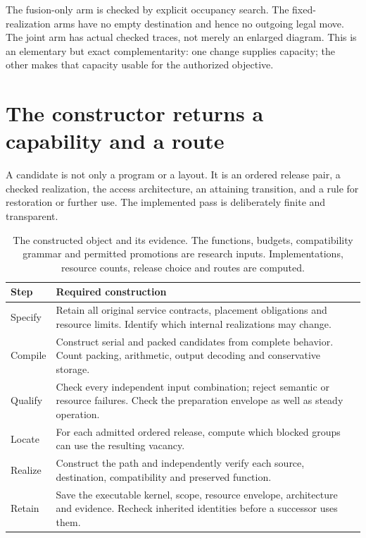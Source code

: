 \documentclass[11pt,letterpaper]{article}
\theoremstyle{definition}\newtheorem{definition}[theorem]{Definition}
\theoremstyle{remark}\newtheorem{remark}[theorem]{Remark}
\begin{document}
The fusion-only arm is checked by explicit occupancy search. The fixed-realization arms have no empty destination and hence no outgoing legal move. The joint arm has actual checked traces, not merely an enlarged diagram. This is an elementary but exact complementarity: one change supplies capacity; the other makes that capacity usable for the authorized objective.

\section{The constructor returns a capability and a route}
\label{sec:algorithm}
A candidate is not only a program or a layout. It is an ordered release pair, a checked realization, the access architecture, an attaining transition, and a rule for restoration or further use. The implemented pass is deliberately finite and transparent.

\begin{table}[htbp]\centering\small
\caption{The constructed object and its evidence. The functions, budgets, compatibility grammar and permitted promotions are research inputs. Implementations, resource counts, release choice and routes are computed.}
\begin{tabularx}{\linewidth}{@{}P{.16\linewidth}Y@{}}\toprule
Step & Required construction\\\midrule
Specify & Retain all original service contracts, placement obligations and resource limits. Identify which internal realizations may change.\\
Compile & Construct serial and packed candidates from complete behavior. Count packing, arithmetic, output decoding and conservative storage.\\
Qualify & Check every independent input combination; reject semantic or resource failures. Check the preparation envelope as well as steady operation.\\
Locate & For each admitted ordered release, compute which blocked groups can use the resulting vacancy.\\
Realize & Construct the path and independently verify each source, destination, compatibility and preserved function.\\
Retain & Save the executable kernel, scope, resource envelope, architecture and evidence. Recheck inherited identities before a successor uses them.\\\bottomrule
\end{tabularx}
\label{tab:constructor}
\end{table}
\end{document}
